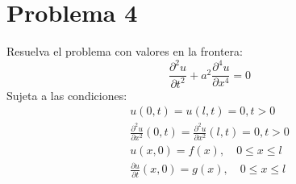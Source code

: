 \section{Problema 4}

 Resuelva el problema con valores en la frontera:
$$
\frac{\partial^{2} u}{\partial t^{2}}+a^{2} \frac{\partial^{4} u}{\partial x^{4}}=0
$$
Sujeta a las condiciones:
$$
\begin{array}{c}
u(0, t)=u(l, t)=0, t>0 \\
\frac{\partial^{2} u}{\partial x^{2}}(0, t)=\frac{\partial^{2} u}{\partial x^{2}}(l, t)=0, t>0 \\
u(x, 0)=f(x), \quad 0 \leq x \leq l \\
\frac{\partial u}{\partial t}(x, 0)=g(x), \quad 0 \leq x \leq l
\end{array}
$$

